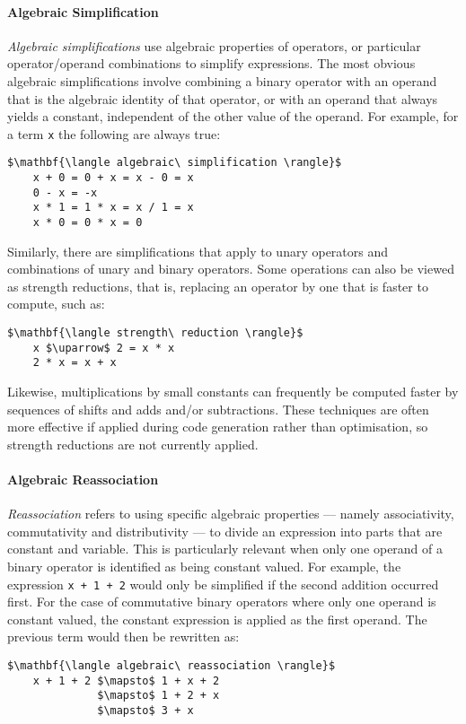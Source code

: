 \paragraph{Algebraic Simplification}

\emph{Algebraic simplifications} use algebraic properties of operators, or
particular operator/operand combinations to simplify expressions. The most
obvious algebraic simplifications involve combining a binary operator with an
operand that is the algebraic identity of that operator, or with an operand that
always yields a constant, independent of the other value of the operand. For
example, for a term \texttt{x} the following are always true:
%
\begin{lstlisting}[style=Haskell,numbers=none,mathescape]
$\mathbf{\langle algebraic\ simplification \rangle}$
    x + 0 = 0 + x = x - 0 = x
    0 - x = -x
    x * 1 = 1 * x = x / 1 = x
    x * 0 = 0 * x = 0
\end{lstlisting}
%
Similarly, there are simplifications that apply to unary operators and
combinations of unary and binary operators. Some operations can also be viewed
as strength reductions, that is, replacing an operator by one that is faster to
compute, such as:
%
\begin{lstlisting}[style=Haskell,numbers=none,mathescape]
$\mathbf{\langle strength\ reduction \rangle}$
    x $\uparrow$ 2 = x * x
    2 * x = x + x
\end{lstlisting}
%
Likewise, multiplications by small constants can frequently be computed faster
by sequences of shifts and adds and/or subtractions. These techniques are often
more effective if applied during code generation rather than optimisation, so
strength reductions are not currently applied.


\paragraph{Algebraic Reassociation}

\emph{Reassociation} refers to using specific algebraic properties --- namely
associativity, commutativity and distributivity --- to divide an expression into
parts that are constant and variable.
This is particularly relevant when only one operand of a binary
operator is identified as being constant valued. For example, the expression
\lstinline{x + 1 + 2} would only be simplified if the second addition occurred
first. For the case of commutative binary operators where only one operand is
constant valued, the constant expression is applied as the first operand. The
previous term would then be rewritten as:
%
\begin{lstlisting}[style=Haskell,numbers=none,mathescape]
$\mathbf{\langle algebraic\ reassociation \rangle}$
    x + 1 + 2 $\mapsto$ 1 + x + 2
              $\mapsto$ 1 + 2 + x
              $\mapsto$ 3 + x
\end{lstlisting}


